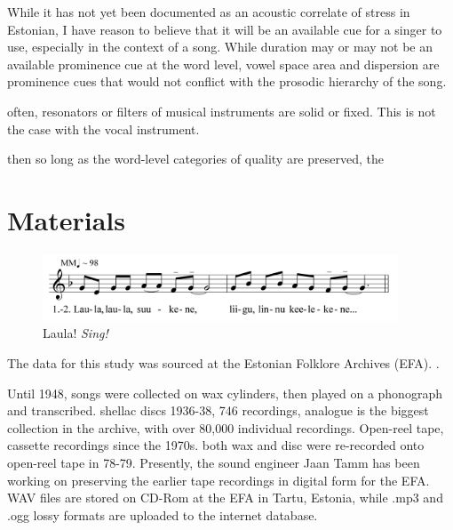 While it has not yet been documented as an acoustic correlate of stress in Estonian, I have reason to believe that it will be an available cue for a singer to use, especially in the context of a song. While duration may or may not be an available prominence cue at the word level, vowel space area and dispersion are prominence cues that would not conflict with the prosodic hierarchy of the song. 

often, resonators or filters of musical instruments are solid or fixed. This is not the case with the vocal instrument.



then so long as the word-level categories of quality are preserved, the 


\section{Materials}

\begin{figure}[htbp]
\centering
\includegraphics[width=300pt]{figures/055.png}
\caption{Laula! {\it Sing!}}
\label{default}
\end{figure}




The data for this study was sourced at the Estonian Folklore Archives (EFA). 
\citep{orasEstonianFolkloreArchives2022a}.



Until 1948, songs were collected on wax cylinders, then played on a phonograph and transcribed. shellac discs 1936-38, 746 recordings, 
analogue is the biggest collection in the archive, with over 80,000 individual recordings. Open-reel tape, cassette recordings since the 1970s. 
both wax and disc were re-recorded onto open-reel tape in 78-79.
Presently, the sound engineer Jaan Tamm has been working on preserving the earlier tape recordings in digital form for the EFA. WAV files are stored on CD-Rom at the EFA in Tartu, Estonia, while .mp3 and .ogg lossy formats are uploaded to the internet database. 
%
%




